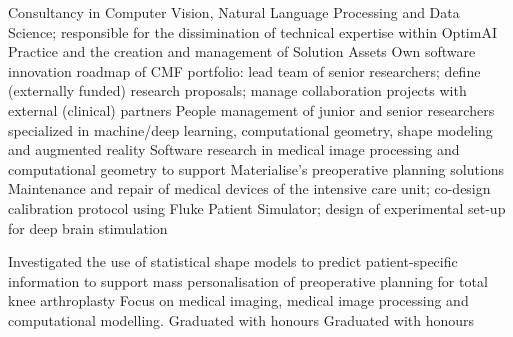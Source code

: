 \documentclass[
	a4paper,
	sidesectionsize=Large,
	maincolor=cvprimary,
	sectioncolor=cvprimary,
	sidecolor=cvprimary!10,
	topbottommargin=0.02\paperheight,
	leftrightmargin=0.02\paperwidth,
	profilepiczoom=1.6,
	profilepicxshift=-1mm,
	profilepicyshift=-7mm,
	profilepicrounding=0.5cm,
]{fortysecondscv}
\begin{document}
\makefrontsidebar
\newlength{\firstpagespacing}
\setlength{\firstpagespacing}{2ex}

\vspace{\firstpagespacing}
\vspace*{-1ex}
\begin{cvtable}[3.5]
	{Consultancy in Computer Vision, Natural Language Processing and Data Science; responsible for the dissimination of technical expertise within OptimAI Practice and the creation and management of Solution Assets}
	{Own software innovation roadmap of CMF portfolio: lead team of senior researchers; define (externally funded) research proposals; manage collaboration projects with external (clinical) partners}
	{People management of junior and senior researchers specialized in machine/deep learning, computational geometry, shape modeling and augmented reality}
	{Software research in medical image processing and computational geometry to support Materialise's preoperative planning solutions}
	{Maintenance and repair of medical devices of the intensive care unit; co-design calibration protocol using Fluke Patient Simulator; design of experimental set-up for deep brain stimulation}
\end{cvtable}

\vspace{\firstpagespacing}
\vspace*{-1ex}
\begin{cvtable}[3.5]
	{Investigated the use of statistical shape models to predict patient-specific information to support mass personalisation of preoperative planning for total knee arthroplasty}
		{Focus on medical imaging, medical image processing and computational modelling. Graduated with honours}
		{Graduated with honours}
\end{cvtable}
\end{document}
